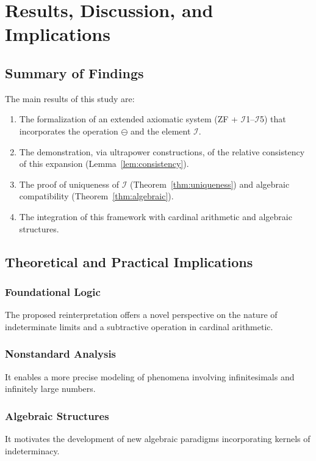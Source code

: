 \documentclass[12pt,a4paper]{article}
\theoremstyle{definition}
\theoremstyle{remark}
\begin{document}
\section{Results, Discussion, and Implications}

\subsection{Summary of Findings}

The main results of this study are:
\begin{enumerate}
\item The formalization of an extended axiomatic system (ZF + $\mathcal{I}$1--$\mathcal{I}$5) that incorporates the operation $\ominus$ and the element $\mathcal{I}$.
\item The demonstration, via ultrapower constructions, of the relative consistency of this expansion (Lemma~\ref{lem:consistency}).
\item The proof of uniqueness of $\mathcal{I}$ (Theorem~\ref{thm:uniqueness}) and algebraic compatibility (Theorem~\ref{thm:algebraic}).
\item The integration of this framework with cardinal arithmetic and algebraic structures.
\end{enumerate}

\subsection{Theoretical and Practical Implications}

\subsubsection{Foundational Logic}
The proposed reinterpretation offers a novel perspective on the nature of indeterminate limits and a subtractive operation in cardinal arithmetic.

\subsubsection{Nonstandard Analysis}
It enables a more precise modeling of phenomena involving infinitesimals and infinitely large numbers.

\subsubsection{Algebraic Structures}
It motivates the development of new algebraic paradigms incorporating kernels of indeterminacy.
\end{document}
